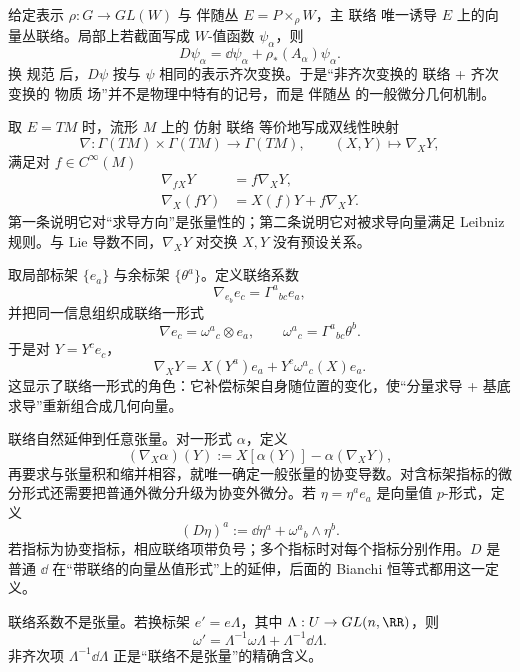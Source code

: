 给定表示 $\rho:G\to GL(W)$ 与 伴随丛 $E=P\times_\rho W$，主 联络 唯一诱导 $E$ 上的向量丛联络。局部上若截面写成 $W$-值函数 $\psi_\alpha$，则
\begin{equation*}D\psi_\alpha
=\dd\psi_\alpha+\rho_*(A_\alpha)\psi_\alpha.\end{equation*}
换 规范 后，$D\psi$ 按与 $\psi$ 相同的表示齐次变换。于是“非齐次变换的 联络 + 齐次变换的 物质 场”并不是物理中特有的记号，而是 伴随丛 的一般微分几何机制。

取 $E=TM$ 时，流形 $M$ 上的 仿射 联络 等价地写成双线性映射
\[
\nabla:\Gamma(TM)\times\Gamma(TM)\to\Gamma(TM),
\qquad
(X,Y)\mapsto\nabla_XY,
\]
满足对 $f\in C^\infty(M)$
\begin{align*}
\nabla_{fX}Y&=f\nabla_XY,\\
\nabla_X(fY)&=X(f)Y+f\nabla_XY.
\end{align*}
第一条说明它对“求导方向”是张量性的；第二条说明它对被求导向量满足 Leibniz 规则。与 Lie 导数不同，$\nabla_XY$ 对交换 $X,Y$ 没有预设关系。

取局部标架 $\{e_a\}$ 与余标架 $\{\theta^a\}$。定义联络系数
\begin{equation*}\nabla_{e_b}e_c=\Gamma^a{}_{bc}e_a,
\end{equation*}
并把同一信息组织成联络一形式
\begin{equation*}\nabla e_c=\omega^a{}_c\otimes e_a,
\qquad
\omega^a{}_c=\Gamma^a{}_{bc}\theta^b.
\end{equation*}
于是对 $Y=Y^ce_c$，
\[
\nabla_XY
=X(Y^a)e_a+Y^c\omega^a{}_c(X)e_a.
\]
这显示了联络一形式的角色：它补偿标架自身随位置的变化，使“分量求导 + 基底求导”重新组合成几何向量。

联络自然延伸到任意张量。对一形式 $\alpha$，定义
\[
(\nabla_X\alpha)(Y)
:=X[\alpha(Y)]-\alpha(\nabla_XY),
\]
再要求与张量积和缩并相容，就唯一确定一般张量的协变导数。对含标架指标的微分形式还需要把普通外微分升级为协变外微分。若 $\eta=\eta^ae_a$ 是向量值 $p$-形式，定义
\begin{equation}\label{eq:math-dg-exterior-covariant-derivative}
(D\eta)^a
:=\dd\eta^a+\omega^a{}_b\wedge\eta^b.
\end{equation}
若指标为协变指标，相应联络项带负号；多个指标时对每个指标分别作用。$D$ 是普通 $\dd$ 在“带联络的向量丛值形式”上的延伸，后面的 Bianchi 恒等式都用这一定义。

联络系数不是张量。若换标架 $e'=e\Lambda$，其中 $\Lambda:U\to GL(n,\RR)$，则
\begin{equation}\label{eq:math-dg-connection-gauge-transform}
\boxed{\omega'=\Lambda^{-1}\omega\Lambda+\Lambda^{-1}\dd\Lambda.}
\end{equation}
非齐次项 $\Lambda^{-1}\dd\Lambda$ 正是“联络不是张量”的精确含义。

